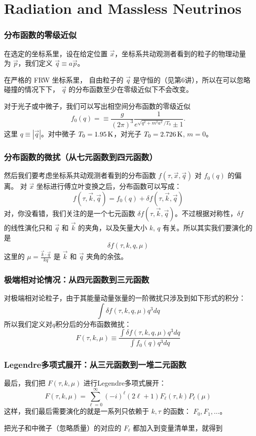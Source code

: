 \documentclass[CJK,13pt]{beamer}
\begin{document}
  
\section{Radiation and Massless Neutrinos}


  \begin{frame}
    \frametitle{分布函数的零级近似}
    在选定的坐标系里，设在给定位置 $\vec{x}$，坐标系共动观测者看到的粒子的物理动量为 $\vec{p}$，我们定义 $\vec{q} \equiv a\vec{p}$。

    在严格的 FRW 坐标系里， 自由粒子的 $\vec{q}$ 是守恒的（见第6讲），所以在可以忽略碰撞的情况下下， $\vec{q}$ 的分布函数至少在零级近似下不会改变。

    \skipline

    对于光子或中微子，我们可以写出相空间分布函数的零级近似
    $$ f_0 (q) = \equiv \frac{g}{(2\pi)^3}\frac{1}{e^{\sqrt{q^2+m^2a^2}/T_0} \pm 1} . $$
    这里 $q \equiv |\vec{q}|$。对中微子 $T_0 = 1.95\,\mathrm{K}$，对光子  $T_0 = 2.726\,\mathrm{K}$, $m=0$。

  \end{frame}


  \begin{frame}
    \frametitle{分布函数的微扰（从七元函数到四元函数）}
    然后我们要考虑坐标系共动观测者看到的分布函数 $f(\tau, \vec{x}, \vec{q})$ 对 $f_0(q)$ 的偏离。 对 $\vec{x}$ 坐标进行傅立叶变换之后，分布函数可以写成：
    $$ f(\tau,\vec{k}, \vec{q}) = f_0(q) + \delta f (\tau, \vec{k},\vec{q}) $$
    对，你没看错，我们关注的是一个七元函数 $\delta f (\tau, \vec{k}, \vec{q})$。不过根据对称性，$\delta f$ 的线性演化只和 $\vec{q}$ 和 $\vec{k}$ 的夹角，以及矢量大小 $k$, $q$ 有关。所以其实我们要演化的是
    $$ \delta f(\tau, k, q, \mu) $$
    这里的 $\mu = \frac{\vec{k}\cdot\vec{q}}{kq}$ 是 $\vec{k}$ 和 $\vec{q}$ 夹角的余弦。

  \end{frame}

  \begin{frame}
    \frametitle{极端相对论情况：从四元函数到三元函数}
    对极端相对论粒子，由于其能量动量张量的一阶微扰只涉及到如下形式的积分：
    $$\int \delta f (\tau, k, q, \mu) q^3 dq $$
    所以我们定义{\blue 对$q$积分后的分布函数微扰}：
    $$ F(\tau, k, \mu) \equiv \frac{\int \delta f (\tau, k, q, \mu) q^3 dq}{\int f_0(q) q^3 dq} $$
  \end{frame}


    \begin{frame}
      \frametitle{Legendre多项式展开：从三元函数到一堆二元函数}
      最后，我们把 $F(\tau, k, \mu)$ 进行Legendre多项式展开：
      $$ F(\tau, k, \mu) = \sum_{\ell=0}^\infty (-i)^\ell (2\ell+1) F_\ell(\tau, k) P_\ell(\mu) $$
      这样，我们最后需要演化的就是一系列只依赖于 $k, \tau$ 的函数： $F_0, F_1, \ldots$。

      \skipline
      
      把光子和中微子（忽略质量）的对应的 $F_\ell$  都加入到变量清单里，就得到
    \end{frame}
\end{document}
